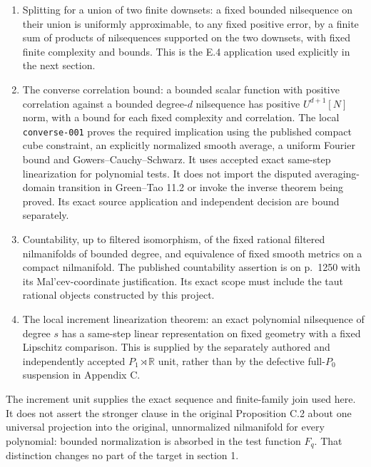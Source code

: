 \documentclass[11pt]{article}
\newcommand{\R}{\mathbb R}
\begin{document}
\begin{enumerate}
scalar component, global test domain, and quadruple count on the
$N^3$ scale are exactly the local theorem's data. The reparametrization
$(h_1,h_2,h_3,h_4)=(h_0+a,h_0+b,h_0+a+b,h_0)$ is therefore unchanged;
the subsequent pigeonhole has $h_0\in I_1$ and $a,b\in[-2N,2N]$.
The E.11 and E.13 inputs require the
actual multivariable Appendix D.5 factorization and all-box reconstruction;
a one-variable D.4 proof does not supply that premise. This obligation
is supplied by the local multifactor theorem and its two independent decisions, as connected below.
\item Splitting for a union of two finite downsets: a fixed bounded
nilsequence on their union is uniformly approximable, to any fixed positive
error, by a finite sum of products of nilsequences supported on the two
downsets, with fixed finite complexity and bounds. This is the E.4
application used explicitly in the next section.
\item The converse correlation bound: a bounded scalar function with
positive correlation against a bounded degree-$d$ nilsequence has positive
$U^{d+1}[N]$ norm, with a bound for each fixed complexity and correlation.
The local \texttt{converse-001} proves the required implication using
the published compact cube constraint, an explicitly normalized smooth
average, a uniform Fourier bound and Gowers--Cauchy--Schwarz. It uses
accepted exact same-step linearization for polynomial tests. It does not
import the disputed averaging-domain transition in Green--Tao 11.2 or
invoke the inverse theorem being proved. Its exact source application
and independent decision are bound separately.
\item Countability, up to filtered isomorphism, of the fixed rational
filtered nilmanifolds of bounded degree, and equivalence of fixed smooth
metrics on a compact nilmanifold. The published countability assertion is
on p.~1250 with its Mal'cev-coordinate justification. Its exact scope must
include the taut rational objects constructed by this project.
\item The local increment linearization theorem: an exact polynomial
nilsequence of degree $s$ has a same-step linear representation on fixed
geometry with a fixed Lipschitz comparison. This is supplied by the
separately authored and independently accepted $P_1\rtimes\R$ unit,
rather than by the defective full-$P_0$ suspension in Appendix C.
\end{enumerate}

The increment unit supplies the exact sequence and finite-family join
used here. It does not assert the stronger clause in the original
Proposition C.2 about one universal projection into the original,
unnormalized nilmanifold for every polynomial: bounded normalization is
absorbed in the test function $F_q$. That distinction changes no part of
the target in section 1.
\end{document}
